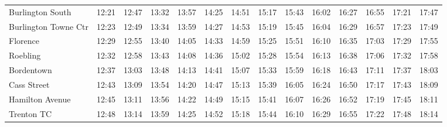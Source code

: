 \begin{center}
\begin{tabular}{@{}lrrrrrrrrrrrrr@{}}
Burlington South & 12:21 & 12:47 & 13:32 & 13:57 & 14:25 & 14:51 & 15:17 & 15:43 & 16:02 & 16:27 & 16:55 & 17:21 & 17:47 \\
Burlington Towne Ctr & 12:23 & 12:49 & 13:34 & 13:59 & 14:27 & 14:53 & 15:19 & 15:45 & 16:04 & 16:29 & 16:57 & 17:23 & 17:49 \\
Florence & 12:29 & 12:55 & 13:40 & 14:05 & 14:33 & 14:59 & 15:25 & 15:51 & 16:10 & 16:35 & 17:03 & 17:29 & 17:55 \\
Roebling & 12:32 & 12:58 & 13:43 & 14:08 & 14:36 & 15:02 & 15:28 & 15:54 & 16:13 & 16:38 & 17:06 & 17:32 & 17:58 \\
Bordentown & 12:37 & 13:03 & 13:48 & 14:13 & 14:41 & 15:07 & 15:33 & 15:59 & 16:18 & 16:43 & 17:11 & 17:37 & 18:03 \\
Cass Street & 12:43 & 13:09 & 13:54 & 14:20 & 14:47 & 15:13 & 15:39 & 16:05 & 16:24 & 16:50 & 17:17 & 17:43 & 18:09 \\
Hamilton Avenue & 12:45 & 13:11 & 13:56 & 14:22 & 14:49 & 15:15 & 15:41 & 16:07 & 16:26 & 16:52 & 17:19 & 17:45 & 18:11 \\
Trenton TC & 12:48 & 13:14 & 13:59 & 14:25 & 14:52 & 15:18 & 15:44 & 16:10 & 16:29 & 16:55 & 17:22 & 17:48 & 18:14 \\
\bottomrule\end{tabular}\end{center}
